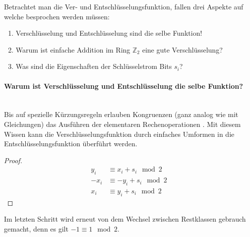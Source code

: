 \noindent
Betrachtet man die Ver- und Entschlüsselungsfunktion, fallen drei Aspekte auf welche
besprochen werden müssen:

\begin{enumerate}[itemsep = 0pt]
  \item Verschlüsselung und Entschlüsselung sind die selbe Funktion!
  \item Warum ist einfache Addition im Ring $\mathbb{Z}_2$ eine gute Verschlüsselung?
  \item Was sind die Eigenschaften der Schlüsselstrom Bits $s_i$?
\end{enumerate}

\paragraph{Warum ist Verschlüsselung und Entschlüsselung die selbe Funktion?}\mbox{}\\
Bis auf spezielle Kürzungsregeln erlauben Kongruenzen (ganz analog wie mit Gleichungen)
das Ausführen der elementaren Rechenoperationen \parencite[181-183]{BOOK:numberTheory}.
Mit diesem Wissen kann die Verschlüsselungsfunktion durch einfaches Umformen in die
Entschlüsselungsfunktion überführt werden.
\begin{proof}
  \begin{align*}
    y_i  & \equiv x_i + s_i \mod{2}  \\
    -x_i & \equiv -y_i + s_i \mod{2} \\
    x_i  & \equiv y_i + s_i \mod{2}
  \end{align*}
\end{proof}
\noindent
Im letzten Schritt wird erneut von dem Wechsel zwischen Restklassen gebrauch gemacht,
denn es gilt $-1 \equiv 1 \mod{2}$.